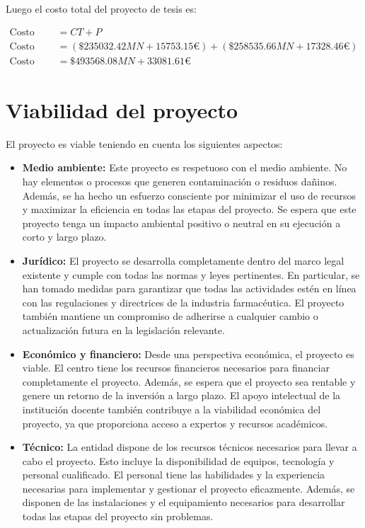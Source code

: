 Luego el costo total del proyecto de tesis es:

\begin{align*}
    \text{Costo total del proyecto de tesis} & = CT + P                                                    \\
    \text{Costo total del proyecto de tesis} & = (\$235032.42MN + 15753.15€) + (\$258535.66MN + 17328.46€) \\
    \text{Costo total del proyecto de tesis} & = \$493568.08MN + 33081.61€
\end{align*}


\section{Viabilidad del proyecto}

El proyecto es viable teniendo en cuenta los siguientes aspectos:

\begin{itemize}
    \item \textbf{Medio ambiente:} Este proyecto es respetuoso con el medio ambiente. No hay elementos o procesos que generen contaminación o residuos dañinos. Además, se ha hecho un esfuerzo consciente por minimizar el uso de recursos y maximizar la eficiencia en todas las etapas del proyecto. Se espera que este proyecto tenga un impacto ambiental positivo o neutral en su ejecución a corto y largo plazo.

    \item \textbf{Jurídico:} El proyecto se desarrolla completamente dentro del marco legal existente y cumple con todas las normas y leyes pertinentes. En particular, se han tomado medidas para garantizar que todas las actividades estén en línea con las regulaciones y directrices de la industria farmacéutica. El proyecto también mantiene un compromiso de adherirse a cualquier cambio o actualización futura en la legislación relevante.

    \item \textbf{Económico y financiero:} Desde una perspectiva económica, el proyecto es viable. El centro tiene los recursos financieros necesarios para financiar completamente el proyecto. Además, se espera que el proyecto sea rentable y genere un retorno de la inversión a largo plazo. El apoyo intelectual de la institución docente también contribuye a la viabilidad económica del proyecto, ya que proporciona acceso a expertos y recursos académicos.

    \item \textbf{Técnico:} La entidad dispone de los recursos técnicos necesarios para llevar a cabo el proyecto. Esto incluye la disponibilidad de equipos, tecnología y personal cualificado. El personal tiene las habilidades y la experiencia necesarias para implementar y gestionar el proyecto eficazmente. Además, se disponen de las instalaciones y el equipamiento necesarios para desarrollar todas las etapas del proyecto sin problemas.
\end{itemize}








